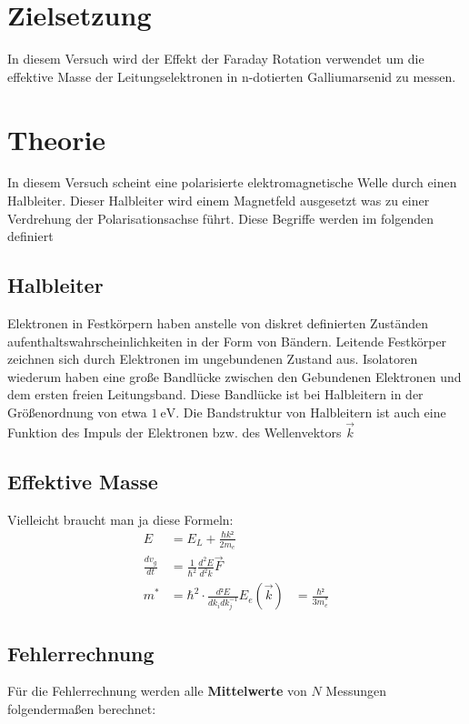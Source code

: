 \section{Zielsetzung}
In diesem Versuch wird der Effekt der Faraday Rotation verwendet um die
effektive Masse der Leitungselektronen in n-dotierten Galliumarsenid zu messen.

\section{Theorie}
In diesem Versuch scheint eine polarisierte elektromagnetische Welle durch
einen Halbleiter. Dieser Halbleiter wird einem Magnetfeld ausgesetzt was zu
einer Verdrehung der Polarisationsachse führt. Diese Begriffe werden im
folgenden definiert

\subsection{Halbleiter \cite[][Kap. 14]{book:expi3}}
Elektronen in Festkörpern haben anstelle von diskret definierten Zuständen
aufenthaltswahrscheinlichkeiten in der Form von Bändern. Leitende Festkörper
zeichnen sich durch Elektronen im ungebundenen Zustand aus. Isolatoren wiederum
haben eine große Bandlücke zwischen den Gebundenen Elektronen und dem ersten
freien Leitungsband. Diese Bandlücke ist bei Halbleitern in der Größenordnung
von etwa $\qty{1}{\eV}$. Die Bandstruktur von Halbleitern ist auch eine Funktion
des Impuls der Elektronen bzw. des Wellenvektors $\vec{k}$

\subsection{Effektive Masse}

Vielleicht braucht man ja diese Formeln:
\begin{align}
	E                 & = E_L + \frac{\hbar k²}{2 m_e}                 \\
	\frac{d v_g}{d t} & = \frac{1}{\hbar^2}\frac{d^2 E}{d^2 k} \vec{F} \\
	m^*               & = \hbar^2 \cdot \frac{d²E}{d k_i d k_j^{-1}}
	E_e(\vec{k})	& = \frac{\hbar²}{3m^*_e}
\end{align}


\subsection{Fehlerrechnung}
Für die Fehlerrechnung werden alle \textbf{Mittelwerte} von $N$ Messungen folgendermaßen berechnet:


